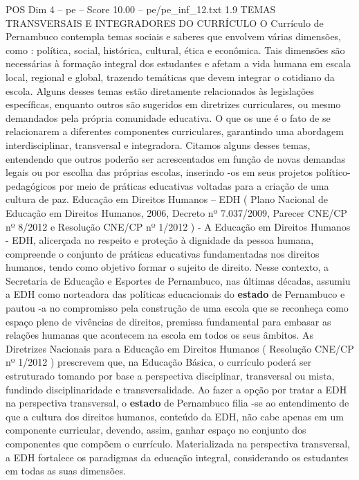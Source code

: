 \begin{textsample}{POS Dim 4 – pe – Score 10.00 – pe/pe\_inf\_12.txt}  \label{ex:f4_pos_271}
1.9 TEMAS TRANSVERSAIS E INTEGRADORES DO CURRÍCULO O Currículo de Pernambuco contempla temas sociais e saberes que envolvem várias dimensões, como : política, social, histórica, cultural, ética e econômica.
Tais dimensões são necessárias à formação integral dos estudantes e afetam a vida humana em escala local, regional e global, trazendo temáticas que devem integrar o cotidiano da escola.
Alguns desses temas estão diretamente relacionados às legislações específicas, enquanto outros são sugeridos em diretrizes curriculares, ou mesmo demandados pela própria comunidade educativa.
O que os une é o fato de se relacionarem a diferentes componentes curriculares, garantindo uma abordagem interdisciplinar, transversal e integradora.
Citamos alguns desses temas, entendendo que outros poderão ser acrescentados em função de novas demandas legais ou por escolha das próprias escolas, inserindo -os em seus projetos político-pedagógicos por meio de práticas educativas voltadas para a criação de uma cultura de paz.
Educação em Direitos Humanos – EDH ( Plano Nacional de Educação em Direitos Humanos, 2006, Decreto nº 7.037/2009, Parecer CNE/CP nº 8/2012 e Resolução CNE/CP nº 1/2012 ) - A Educação em Direitos Humanos - EDH, alicerçada no respeito e proteção à dignidade da pessoa humana, compreende o conjunto de práticas educativas fundamentadas nos direitos humanos, tendo como objetivo formar o sujeito de direito.
Nesse contexto, a Secretaria de Educação e Esportes de Pernambuco, nas últimas décadas, assumiu a EDH como norteadora das políticas educacionais do \textbf{estado} de Pernambuco e pautou -a no compromisso pela construção de uma escola que se reconheça como espaço pleno de vivências de direitos, premissa fundamental para embasar as relações humanas que acontecem na escola em todos os seus âmbitos.
As Diretrizes Nacionais para a Educação em Direitos Humanos ( Resolução CNE/CP nº 1/2012 ) prescrevem que, na Educação Básica, o currículo poderá ser estruturado tomando por base a perspectiva disciplinar, transversal ou mista, fundindo disciplinaridade e transversalidade.
Ao fazer a opção por tratar a EDH na perspectiva transversal, o \textbf{estado} de Pernambuco filia -se ao entendimento de que a cultura dos direitos humanos, conteúdo da EDH, não cabe apenas em um componente curricular, devendo, assim, ganhar espaço no conjunto dos componentes que compõem o currículo.
Materializada na perspectiva transversal, a EDH fortalece os paradigmas da educação integral, considerando os estudantes em todas as suas dimensões.

\end{textsample}
